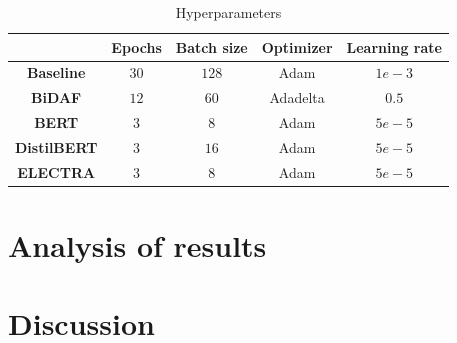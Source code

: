 \documentclass[a4paper,10pt]{report}
\begin{document}
\begin{table}[h]
  \center
  \begin{tabular}{|c|c|c|c|c|}
    \hline
                        & \textbf{Epochs} & \textbf{Batch size} & \textbf{Optimizer} & \textbf{Learning rate} \\ \hline
    \textbf{Baseline}   & $30$            & $128$               & Adam               & $1e-3$                 \\ \hline
    \textbf{BiDAF}      & $12$            & $60$                & Adadelta           & $0.5$                  \\ \hline
    \textbf{BERT}       & $3$             & $8$                 & Adam               & $5e-5$                 \\ \hline
    \textbf{DistilBERT} & $3$             & $16$                & Adam               & $5e-5$                 \\ \hline
    \textbf{ELECTRA}    & $3$             & $8$                 & Adam               & $5e-5$                 \\ \hline
  \end{tabular}
  \caption{Hyperparameters}
  \label{table:hyperparameters}
\end{table}

\chapter{Analysis of results}\label{chap:analysis-results}

\chapter{Discussion}\label{chap:discussion}

\printbibliography
\end{document}
